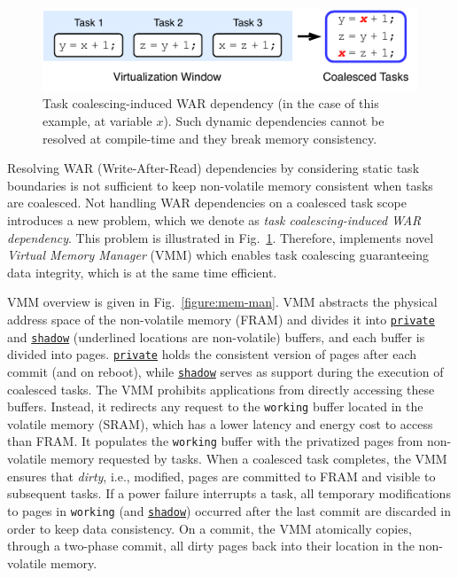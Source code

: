 \begin{figure}
	\centering
	\includegraphics[width=0.8\columnwidth]{figures/coalesced-war.pdf}
	\caption{Task coalescing-induced WAR dependency (in the case of this example, at variable $x$). Such dynamic dependencies cannot be resolved at compile-time and they break memory consistency.}
	\label{figure:coalescedWar}
\end{figure}

Resolving WAR (Write-After-Read) dependencies by considering static task boundaries is not sufficient to keep non-volatile memory consistent when tasks are coalesced. Not handling WAR dependencies on a coalesced task scope introduces a new problem, which we denote as \emph{task coalescing-induced WAR dependency}. This problem is illustrated in Fig.~\ref{figure:coalescedWar}. Therefore, \sys implements novel {\em Virtual Memory Manager} (VMM) which enables task coalescing guaranteeing data integrity, which is at the same time efficient.

VMM overview is given in Fig.~\ref{figure:mem-man}.
VMM abstracts the physical address space of the non-volatile memory (FRAM) and divides it into \texttt{\underline{private}} and \texttt{\underline{shadow}} (underlined locations are non-volatile) buffers, and each buffer is divided into pages.
\texttt{\underline{private}} holds the consistent version of pages after each commit (and on reboot), while \texttt{\underline{shadow}} serves as support during the execution of coalesced tasks.
The VMM prohibits applications from directly accessing these buffers.
Instead, it redirects any request to the \texttt{working} buffer located in the volatile memory (SRAM), which has a lower latency and energy cost to access than FRAM.
It populates the \texttt{working} buffer with the privatized pages from non-volatile memory requested by tasks.
When a coalesced task completes, the VMM ensures that {\em dirty}, i.e., modified, pages are committed to FRAM and visible to subsequent tasks.
If a power failure interrupts a task, all temporary modifications to pages in \texttt{working} (and \texttt{\underline{shadow}}) occurred after the last commit are discarded in order to keep data consistency.
On a commit, the VMM atomically copies, through a two-phase commit, all dirty pages back into their location in the non-volatile memory.

